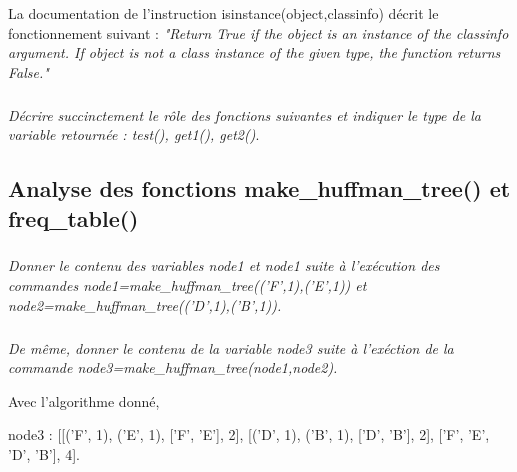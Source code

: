 \documentclass[10pt]{article}
\newif\ifprof
\begin{document}
La documentation de l'instruction \textsf{isinstance(object,classinfo)} décrit le fonctionnement suivant : \textit{"Return True if the object is an instance of the classinfo argument. If object is
not a class instance of the given type, the function returns False."}

\subparagraph{}
\textit{Décrire succinctement le rôle des fonctions suivantes et indiquer le type de la variable retournée : \textsf{test()}, \textsf{get1()}, \textsf{get2()}}.
\ifprof
\begin{corrige}
La fonction \textsf{(test()}  permet de vérifier qu'un objet \textsf{x} est bien une feuille de l'arbre de Huffman. Elle renvoie donc True si l'objet est un tuple de taille 2 dont le premier élément est une chaîne de caractère et le second élément est un entier.

Le fonction \textsf{get1()} permet de retourner la première valeur d'un tuple à savoir le caractère si c'est une feuille de l'abre de Huffman qui est passée en paramètre.  

Le fonction \textsf{get2()} permet de retourner la seconde valeur d'un tuple à savoir le poids associé au caractère si c'est une feuille de l'abre de Huffman qui est passée en paramètre. 
\end{corrige}

\else
\fi

\subsection{Analyse des fonctions \textsf{make\_huffman\_tree()} et \textsf{freq\_table()}}

\subparagraph{}
\textit{Donner le contenu des variables \textsf{node1} et \textsf{node1} suite à l'exécution des commandes \textsf{node1=make\_huffman\_tree(('F',1),('E',1))} et \textsf{node2=make\_huffman\_tree(('D',1),('B',1))}.}
\ifprof
\begin{corrige}
Avec l'algorithme donné, 
\begin{itemize}
\item \textsf{node1 : [('F', 1), ('E', 1), ['F', 'E'], 2]};
\item \textsf{node2 : [('D', 1), ('B', 1), ['D', 'B'], 2]}.
\end{itemize}
\end{corrige}

\else
\fi


\subparagraph{}
\textit{De même, donner le contenu de la variable \textsf{node3} suite à l'exéction de la commande \textsf{node3=make\_huffman\_tree(node1,node2)}.}
\ifprof
\begin{corrige}
Avec l'algorithme donné, 

  \textsf{node3 : [[('F', 1), ('E', 1), ['F', 'E'], 2], [('D', 1), ('B', 1), ['D', 'B'], 2], ['F', 'E', 'D', 'B'], 4]}.
\end{corrige}
\end{document}
